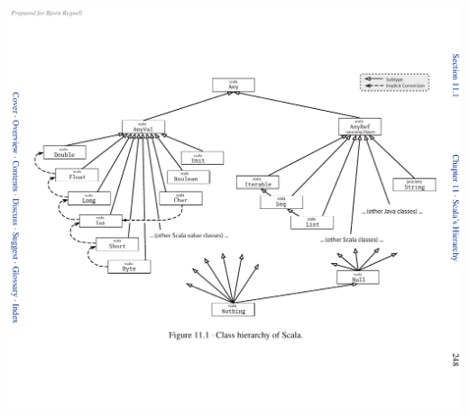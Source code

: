 \documentclass[article, a5paper]{memoir}
\newcommand{\LangColor}{red}
\newcommand{\head}[1]{{\bfseries {\color{\LangColor}{#1}}\par\vspace{1mm}\hrule\vspace{-2mm}}}
\newcommand{\Newline}{\vspace{\baselineskip}}
\begin{document}
\clearpage
\Newline\head{The Scala Type System}%
\vspace{-0.5em}\includegraphics[width=1.05\textwidth,trim=12mm 0 0 0cm]{../img/hierarchy.pdf}
\end{document}
